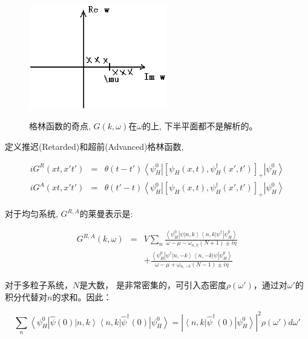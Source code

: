 \begin{figure}[h]
\begin{center}
  \includegraphics[width=6cm]{GF_poles.ps}\\
  \caption{格林函数的奇点, $G(k, \omega)$在$\omega$的上, 下半平面都不是解析的。}\label{GF poles}
\end{center}
\end{figure}


定义推迟(Retarded)和超前(Advanced)格林函数,

\begin{eqnarray*}
  iG^R (xt,x't') &=& \theta(t-t') \left\langle \psi_H^0 \right| \left[ \psi_H(x,t), \psi_H^\dagger(x',t') \right]_+ \left| \psi_H^0 \right\rangle \\
  iG^A (xt,x't') &=& \theta(t'-t) \left\langle \psi_H^0 \right| \left[ \psi_H(x,t), \psi_H^\dagger(x',t') \right]_+ \left| \psi_H^0 \right\rangle
\end{eqnarray*}


对于均匀系统, $G^{R,A}$的莱曼表示是:

\begin{eqnarray*}
  G^{R,A}(k,\omega) &=& V \sum_n  \frac{\left\langle \psi_H^0 \right|\psi \left|n,k
\right\rangle \left\langle n,k \right|\psi^\dagger \left| \psi_H^0
\right\rangle }{\omega-\mu-\omega_{n,k}(N+1) \pm i \eta}\\
  {} & & +
\frac{\left\langle \psi_H^0 \right| \psi^\dagger \left|n,-k
\right\rangle \left\langle n,-k \right|\psi \left| \psi_H^0
\right\rangle }{\omega-\mu + \omega_{n,-k}(N-1) \pm i \eta}
\end{eqnarray*}






对于多粒子系统，$N$是大数，
是非常密集的，可引入态密度$\rho(\omega')$，通过对$\omega'$的积分代替对$n$的求和。因此：



\[
\sum\limits_{n}  {\left\langle {\psi _H^0 } \right|\hat \psi
(0)\left| {n,k} \right\rangle \left\langle {n,k} \right|\hat \psi
^\dagger (0)\left| {\psi _H^0 } \right\rangle }  = \left|
{\left\langle {n,k} \right|\hat \psi ^\dagger  (0)\left| {\psi _H^0
} \right\rangle } \right|^2 \rho \left( {\omega '} \right)d\omega '
\]



